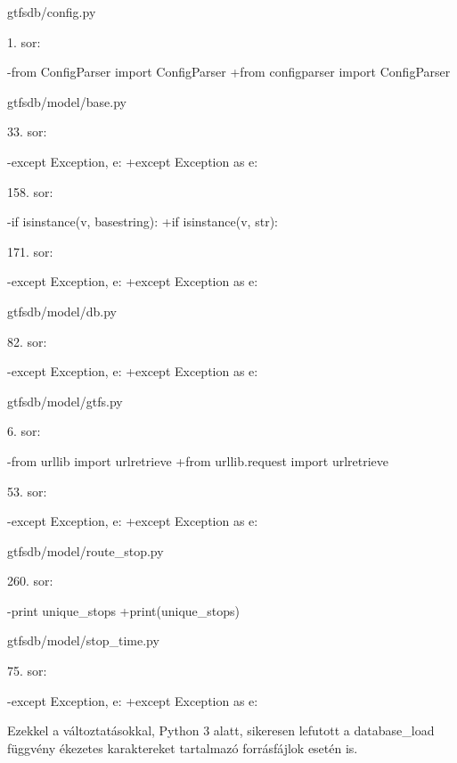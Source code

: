 gtfsdb/config.py

1. sor:
\begin{python}
-from ConfigParser import ConfigParser
+from configparser import ConfigParser
\end{python}

gtfsdb/model/base.py

33. sor:
\begin{python}
-except Exception, e:
+except Exception as e: 
\end{python}

158. sor:
\begin{python}
-if isinstance(v, basestring):
+if isinstance(v, str):
\end{python}

171. sor:
\begin{python}
-except Exception, e:
+except Exception as e:
\end{python}

gtfsdb/model/db.py

82. sor:
\begin{python}
-except Exception, e:
+except Exception as e:
\end{python}

gtfsdb/model/gtfs.py

6. sor:
\begin{python}
-from urllib import urlretrieve
+from urllib.request import urlretrieve
\end{python}

53. sor:
\begin{python}
-except Exception, e:
+except Exception as e:
\end{python}

gtfsdb/model/route\_stop.py

260. sor:
\begin{python}
-print unique_stops
+print(unique_stops)
\end{python}

gtfsdb/model/stop\_time.py

75. sor:
\begin{python}
-except Exception, e:
+except Exception as e:
\end{python}

Ezekkel a változtatásokkal, Python 3 alatt, sikeresen lefutott a database\_load függvény ékezetes karaktereket tartalmazó forrásfájlok esetén is.

